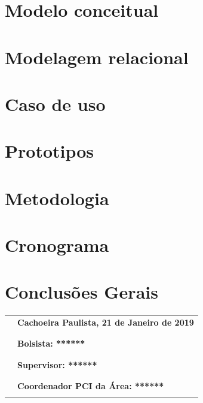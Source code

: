 \documentclass[11pt]{article}
\begin{document}
\newpage

\section{Modelo conceitual}

\newpage

\section{Modelagem relacional}

\newpage

\section{Caso de uso}

\newpage

\section{Prototipos}

\newpage

\section{Metodologia}

\newpage

\section{Cronograma}

\newpage

\section{Conclusões Gerais}

\newpage


\begin{center}
    \begin{flushright}
        \begin{tabular}{@{}p{.5in}p{4in}@{}}
            & \textbf{Cachoeira Paulista, 21 de Janeiro de 2019}\\ \\
            & \hrulefill\\
            & \textbf{Bolsista: ******}\\ \\
            & \hrulefill\\
            & \textbf{Supervisor: ******}\\ \\
            & \hrulefill\\
            & \textbf{Coordenador PCI da Área: ******}\\ \\
        \end{tabular}
    \end{flushright}
\end{center}
\end{document}
